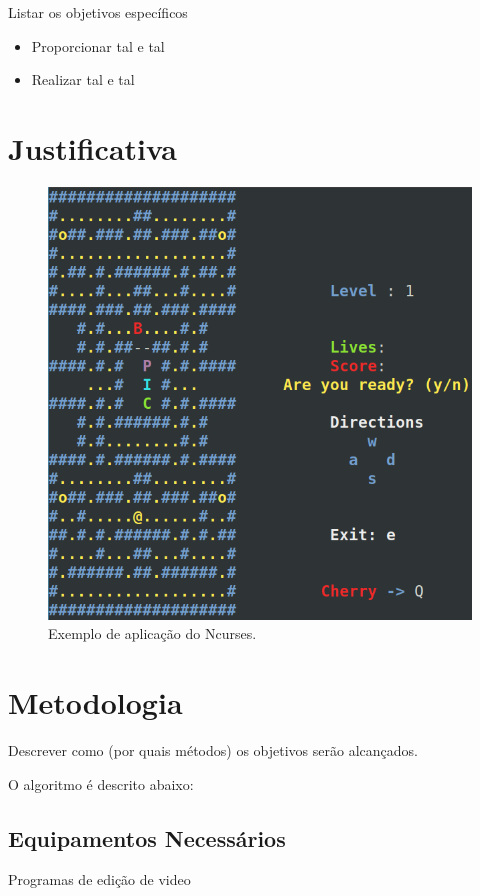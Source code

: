 \documentclass[a4paper,10pt]{article} %
\begin{document}
Listar os objetivos específicos

\begin{itemize}
 \item Proporcionar tal e tal
 \item Realizar tal e tal
\end{itemize}


\section{Justificativa}



\begin{figure}[!htb]
\centering
\includegraphics[width=.80\linewidth]{imagem.png}
\caption{Exemplo de aplicação do Ncurses.}
\label{fig:xsort}
\end{figure}


\section{Metodologia}

Descrever como (por quais métodos) os objetivos serão alcançados.

O algoritmo é descrito abaixo:

\subsection{Equipamentos Necessários}
Programas de edição de video
\end{document}
